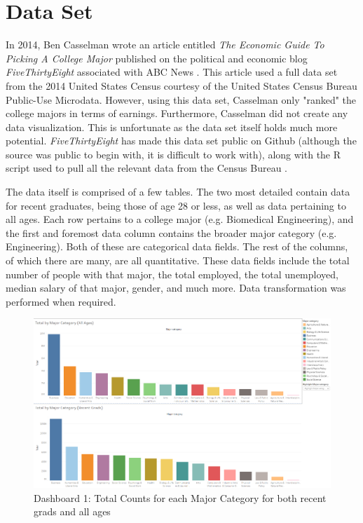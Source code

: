 \documentclass[sigchi]{acmart}
\begin{document}
\section{Data Set}

In 2014, Ben Casselman wrote an article entitled \textit{The Economic Guide To Picking A College Major} published on the political and economic blog \textit{FiveThirtyEight} associated with ABC News \cite{fivethirtyeight}. This article used a full data set from the 2014 United States Census courtesy of the United States Census Bureau Public-Use Microdata. However, using this data set, Casselman only "ranked" the college majors in terms of earnings. Furthermore, Casselman did not create any data visualization. This is unfortunate as the data set itself holds much more potential. \textit{FiveThirtyEight} has made this data set public on Github (although the source was public to begin with, it is difficult to work with), along with the R script used to pull all the relevant data from the Census Bureau \cite{github}. 

The data itself is comprised of a few tables. The two most detailed contain data for recent graduates, being those of age 28 or less, as well as data pertaining to all ages. Each row pertains to a college major (e.g. Biomedical Engineering), and the first and foremost data column contains the broader major category (e.g. Engineering). Both of these are categorical data fields. The rest of the columns, of which there are many, are all quantitative. These data fields include the total number of people with that major, the total employed, the total unemployed, median salary of that major, gender, and much more. Data transformation was performed when required.

  \begin{figure}[thpb]
  \includegraphics[width=1.0\textwidth]{DB1.png}
     \caption{Dashboard 1: Total Counts for each Major Category for both recent grads and all ages}
         \label{fig:db1}
  \end{figure}
  
\end{document}

